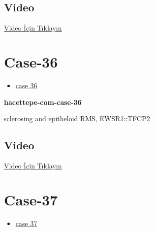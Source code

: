 \documentclass[
  letterpaper,
  DIV=11,
  numbers=noendperiod]{scrreprt}
\providecommand{\tightlist}{%
  \setlength{\itemsep}{0pt}\setlength{\parskip}{0pt}}\usepackage{longtable,booktabs,array}
\begin{document}
\hypertarget{video-33}{%
\subsection{Video}\label{video-33}}

\href{https://www.youtube.com/watch?v=f_rdB9xqpiw}{Video İçin Tıklayın}

\hypertarget{sec-hacettepe-case-of-the-month-case-36}{%
\section{Case-36}\label{sec-hacettepe-case-of-the-month-case-36}}

\begin{itemize}
\tightlist
\item
  \href{https://www.youtube.com/watch?v=ga7KjbH3U1s\&ab_channel=KemalKosemehmetoglu}{case
  36}
\end{itemize}

\textbf{hacettepe-com-case-36}

\begin{tcolorbox}[enhanced jigsaw, left=2mm, toprule=.15mm, rightrule=.15mm, bottomrule=.15mm, leftrule=.75mm, colback=white, colframe=quarto-callout-tip-color-frame, toptitle=1mm, breakable, titlerule=0mm, colbacktitle=quarto-callout-tip-color!10!white, bottomtitle=1mm, title=\textcolor{quarto-callout-tip-color}{\faLightbulb}\hspace{0.5em}{Tanı}, arc=.35mm, opacitybacktitle=0.6, opacityback=0, coltitle=black]

sclerosing and epitheloid RMS, EWSR1::TFCP2

\end{tcolorbox}

\hypertarget{video-34}{%
\subsection{Video}\label{video-34}}

\href{https://www.youtube.com/watch?v=ga7KjbH3U1s}{Video İçin Tıklayın}

\hypertarget{sec-hacettepe-case-of-the-month-case-37}{%
\section{Case-37}\label{sec-hacettepe-case-of-the-month-case-37}}

\begin{itemize}
\tightlist
\item
  \href{https://www.youtube.com/watch?v=H8cnZqL29eI\&ab_channel=KemalKosemehmetoglu}{case
  37}
\end{itemize}
\end{document}
